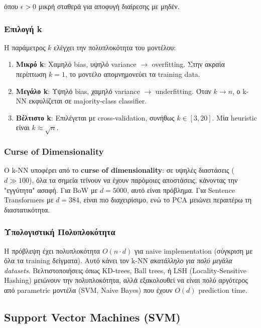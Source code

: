 \documentclass[12pt,a4paper,twoside]{book}
\begin{document}
όπου \(\epsilon > 0\) μικρή σταθερά για αποφυγή διαίρεσης με μηδέν.

\subsubsection{Επιλογή k}

Η παράμετρος \(k\) ελέγχει την πολυπλοκότητα του μοντέλου:
\begin{enumerate}
    \item \textbf{Μικρό k}: Χαμηλό bias, υψηλό variance \(\rightarrow\) overfitting. Στην ακραία περίπτωση \(k=1\), το μοντέλο απομνημονεύει τα training data.

    \item \textbf{Μεγάλο k}: Υψηλό bias, χαμηλό variance \(\rightarrow\) underfitting. Όταν \(k \rightarrow n\), ο k-NN εκφυλίζεται σε majority-class classifier.

    \item \textbf{Βέλτιστο k}: Επιλέγεται με cross-validation, συνήθως \(k \in [3, 20]\). Μία heuristic είναι \(k \approx \sqrt{n}\).
\end{enumerate}

\subsubsection*{Curse of Dimensionality}

Ο k-NN υποφέρει από το \textbf{curse of dimensionality}: σε υψηλές διαστάσεις (\(d \gg 100\)), όλα τα σημεία τείνουν να έχουν παρόμοιες αποστάσεις, κάνοντας την "εγγύτητα" ασαφή. Για BoW με \(d=5000\), αυτό είναι πρόβλημα. Για Sentence Transformers με \(d=384\), είναι πιο διαχειρίσιμο, ενώ το PCA μειώνει περαιτέρω τη διαστατικότητα.

\subsubsection*{Υπολογιστική Πολυπλοκότητα}

Η πρόβλεψη έχει πολυπλοκότητα \(O(n \cdot d)\) για naive implementation (σύγκριση με όλα τα training δείγματα). Αυτό κάνει τον k-NN \textit{ακατάλληλο για πολύ μεγάλα datasets}. Βελτιστοποιήσεις όπως KD-trees, Ball trees, ή LSH (Locality-Sensitive Hashing) μειώνουν την πολυπλοκότητα, αλλά εξακολουθεί να είναι πολύ αργότερος από parametric μοντέλα (SVM, Naive Bayes) που έχουν \(O(d)\) prediction time.
\subsection{Support Vector Machines (SVM)}
\end{document}
